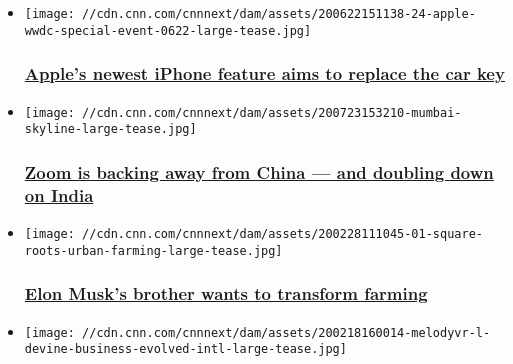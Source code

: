 \begin{itemize}
\item
  \href{/2020/06/22/tech/apple-car-key/index.html}{}

  \texttt{[image: //cdn.cnn.com/cnnnext/dam/assets/200622151138-24-apple-wwdc-special-event-0622-large-tease.jpg]}

  \hypertarget{apples-newest-iphone-feature-aims-to-replace-the-car-key}{%
  \subsubsection{\texorpdfstring{\href{/2020/06/22/tech/apple-car-key/index.html}{Apple's
  newest iPhone feature aims to replace the car
  key}}{Apple's newest iPhone feature aims to replace the car key}}\label{apples-newest-iphone-feature-aims-to-replace-the-car-key}}
\item
  \href{/2020/07/24/tech/zoom-india-hiring-china/index.html}{}

  \texttt{[image: //cdn.cnn.com/cnnnext/dam/assets/200723153210-mumbai-skyline-large-tease.jpg]}

  \hypertarget{zoom-is-backing-away-from-china--and-doubling-down-on-india}{%
  \subsubsection{\texorpdfstring{\href{/2020/07/24/tech/zoom-india-hiring-china/index.html}{Zoom
  is backing away from China --- and doubling down on
  India}}{Zoom is backing away from China --- and doubling down on India}}\label{zoom-is-backing-away-from-china--and-doubling-down-on-india}}
\item
  \href{/2020/02/28/business/musk-vertical-farm/index.html}{}

  \texttt{[image: //cdn.cnn.com/cnnnext/dam/assets/200228111045-01-square-roots-urban-farming-large-tease.jpg]}

  \hypertarget{elon-musks-brother-wants-to-transform-farming}{%
  \subsubsection{\texorpdfstring{\href{/2020/02/28/business/musk-vertical-farm/index.html}{Elon
  Musk's brother wants to transform
  farming}}{Elon Musk's brother wants to transform farming}}\label{elon-musks-brother-wants-to-transform-farming}}
\item
  \href{/2020/02/27/tech/vr-live-music-intl/index.html}{}

  \texttt{[image: //cdn.cnn.com/cnnnext/dam/assets/200218160014-melodyvr-l-devine-business-evolved-intl-large-tease.jpg]}


\end{itemize}
